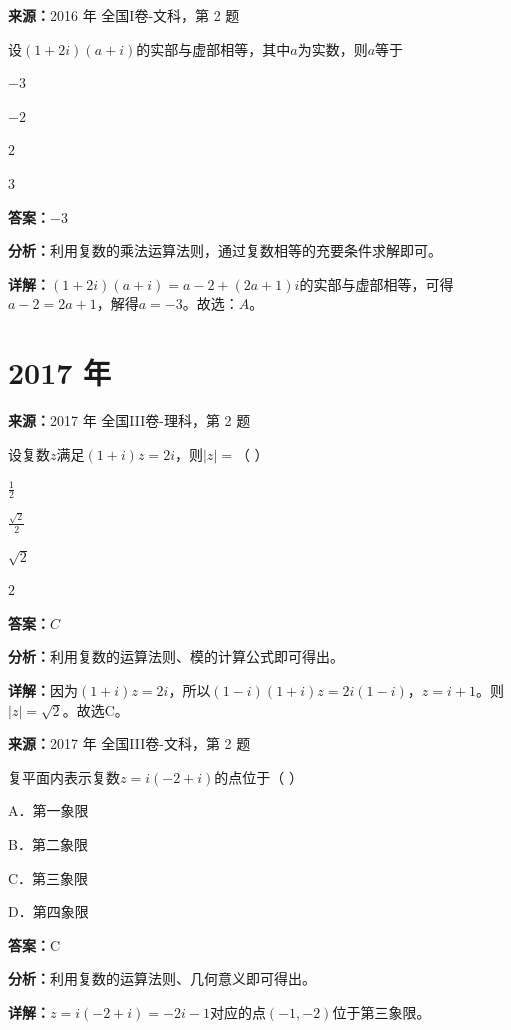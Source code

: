 \begin{question}[points=5]
\textbf{来源：}2016 年 全国I卷-文科，第 2 题\par
设$(1+2i)(a+i)$的实部与虚部相等，其中$a$为实数，则$a$等于
\begin{choices}
  \item $-3$
  \item $-2$
  \item $2$
  \item $3$
\end{choices}
\begin{solution}
\textbf{答案：}$-3$

\textbf{分析：}利用复数的乘法运算法则，通过复数相等的充要条件求解即可。

\textbf{详解：}$(1+2i)(a+i)=a-2+(2a+1)i$的实部与虚部相等，可得$a-2=2a+1$，解得$a=-3$。故选：$A$。
\end{solution}
\end{question}

\section*{2017 年}

\begin{question}[points=5]
\textbf{来源：}2017 年 全国III卷-理科，第 2 题\par
设复数$z$满足$(1+i)z=2i$，则$|z|=$（ ）
\begin{choices}
  \item $\frac{1}{2}$
  \item $\frac{\sqrt{2}}{2}$
  \item $\sqrt{2}$
  \item $2$
\end{choices}
\begin{solution}
\textbf{答案：}$C$

\textbf{分析：}利用复数的运算法则、模的计算公式即可得出。

\textbf{详解：}因为$(1+i)z=2i$，所以$(1-i)(1+i)z=2i(1-i)$，$z=i+1$。则$|z|=\sqrt{2}$。故选C。
\end{solution}
\end{question}

\begin{question}[points=5]
\textbf{来源：}2017 年 全国III卷-文科，第 2 题\par
复平面内表示复数$z=i(-2+i)$的点位于（            ）
\begin{choices}
  \item A．第一象限
  \item B．第二象限
  \item C．第三象限
  \item D．第四象限
\end{choices}
\begin{solution}
\textbf{答案：}C

\textbf{分析：}利用复数的运算法则、几何意义即可得出。

\textbf{详解：}$z=i(-2+i)=-2i-1$对应的点$(-1,-2)$位于第三象限。
\end{solution}
\end{question}

